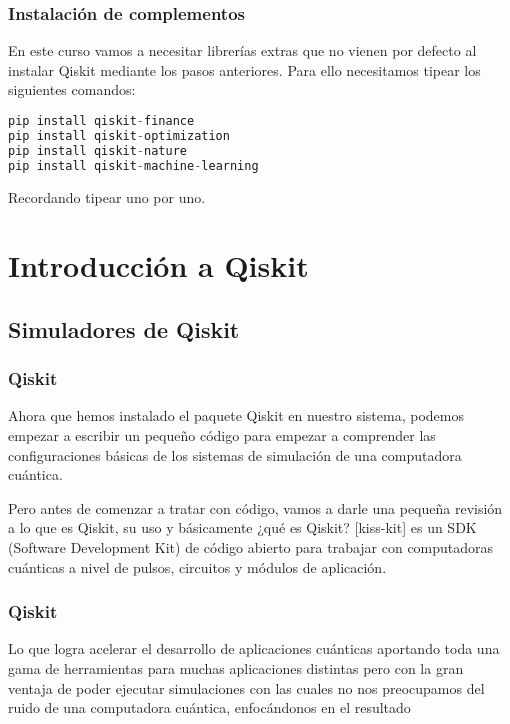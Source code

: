 \documentclass[spanish]{beamer}
\begin{document}
\begin{frame}[fragile]\frametitle{Instalación de complementos}
\justify\setlength{\parskip}{5mm}
En este curso vamos a necesitar librerías extras que no vienen por defecto al instalar Qiskit mediante los pasos anteriores. Para ello necesitamos tipear los siguientes comandos:
\begin{lstlisting}[language=c++]
pip install qiskit-finance
pip install qiskit-optimization
pip install qiskit-nature
pip install qiskit-machine-learning\end{lstlisting}
Recordando tipear uno por uno.
\end{frame}
\section{Introducción a Qiskit}\subsection{Simuladores de Qiskit}
\justify\setlength{\parskip}{5mm}
\begin{frame}\frametitle{Qiskit} 

Ahora que hemos instalado el paquete Qiskit en nuestro sistema, podemos empezar a escribir un pequeño código para empezar a comprender las configuraciones básicas de los sistemas de simulación de una computadora cuántica.

Pero antes de comenzar a tratar con código, vamos a darle una pequeña revisión a lo que es Qiskit, su uso y básicamente ¿qué es Qiskit? [kiss-kit] es un SDK (Software Development Kit) de código abierto para trabajar con computadoras cuánticas a nivel de pulsos, circuitos y módulos de aplicación. 
\end{frame} 

\newpage\justify\setlength{\parskip}{5mm}
\begin{frame}\frametitle{Qiskit} 
Lo que logra acelerar el desarrollo de aplicaciones cuánticas aportando toda una gama de herramientas para muchas aplicaciones distintas pero con la gran ventaja de poder ejecutar simulaciones con las cuales no nos preocupamos del ruido de una computadora cuántica, enfocándonos en el resultado
\end{frame} 
\end{document}
